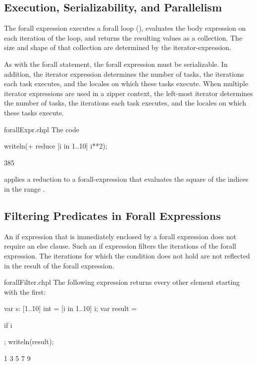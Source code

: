 \subsection{Execution, Serializability, and Parallelism}

The forall expression executes a forall loop (),
evaluates the body expression on each iteration of the loop,
and returns the resulting values as a collection.
The size and shape of that collection
are determined by the iterator-expression.

As with the forall statement, the forall expression must be
serializable.  In addition, the iterator expression determines the
number of tasks, the iterations each task executes, and the locales on
which these tasks execute.  When multiple iterator expressions are
used in a zipper context, the left-most iterator determines the number
of tasks, the iterations each task executes, and the locales on which
these tasks execute.

\begin{chapelexample}{forallExpr.chpl}
The code
\begin{chapel}
writeln(+ reduce [i in 1..10] i**2);
\end{chapel}
\begin{chapeloutput}
385
\end{chapeloutput}
applies a reduction to a forall-expression that evaluates the square
of the indices in the range .
\end{chapelexample}

\subsection{Filtering Predicates in Forall Expressions}
\label{Filtering_Predicates_Forall}

An if expression that is immediately enclosed by a forall expression
does not require an else clause. Such an if
expression filters the iterations of the forall expression.
The iterations for which the condition does not hold
are not reflected in the result of the forall expression.

\begin{chapelexample}{forallFilter.chpl}
The following expression returns every other element starting with the
first:
\begin{chapelpre}
var s: [1..10] int = [i in 1..10] i;
var result =
\end{chapelpre}
\begin{chapel}
[i in 1..s.numElements] if i %
\end{chapel}
\begin{chapelpost}
;
writeln(result);
\end{chapelpost}
\begin{chapeloutput}
1 3 5 7 9
\end{chapeloutput}
\end{chapelexample}

